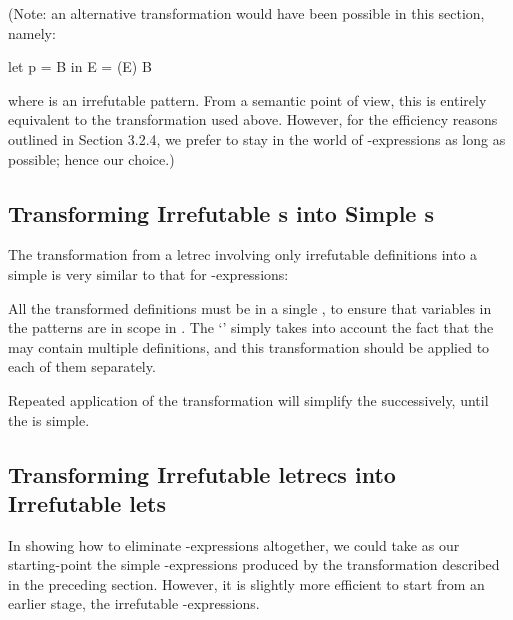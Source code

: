 {(Note: an alternative transformation would have been possible in this
section, namely:
\begin{mlcoded}
	let p = B in E = (E) B
\end{mlcoded}
where  is an irrefutable pattern. From a semantic point of view, this is
entirely equivalent to the transformation used above. However, for the
efficiency reasons outlined in Section 3.2.4, we prefer to stay in the world of
-expressions as long as possible; hence our choice.)

\subsection{Transforming Irrefutable s into Simple s}

The transformation from a letrec involving only irrefutable definitions into a
simple  is very similar to that for -expressions:



All the transformed definitions must be in a single , to ensure that
variables in the patterns  are in scope in . The `' simply
takes into account the fact that the  may contain multiple definitions, and
this transformation should be applied to each of them separately.

Repeated application of the transformation will simplify the  successively,
until the  is simple.

\subsection{Transforming Irrefutable letrecs into Irrefutable lets}

In showing how to eliminate -expressions altogether, we could take as
our starting-point the simple -expressions produced by the transformation
described in the preceding section. However, it is slightly more efficient
to start from an earlier stage, the irrefutable -expressions.

}
